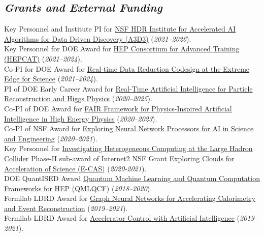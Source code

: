 \documentclass[11pt]{res}
\newcommand{\MarginText}[1]{\section{\textit{#1}}}
\begin{document}
\begin{resume}
  \MarginText{Grants and External Funding}
  Key Personnel and Institute PI for \href{https://www.nsf.gov/awardsearch/showAward?AWD_ID=2117997&HistoricalAwards=false}{NSF HDR Institute for Accelerated AI Algorithms for Data Driven Discovery (A3D3)} (\textit{2021--2026}).\\
  Key Personnel for DOE Award for \href{https://science.osti.gov/-/media/hep/pdf/Awards/HEP_instrumentation_awards_list.pdf}{HEP Consortium for Advanced Training (HEPCAT)} (\textit{2021--2024}).\\
  Co-PI for DOE Award for \href{https://science.osti.gov/-/media/ascr/pdf/funding/2021/Data_Reduction_Awards.pdf}{Real‐time Data Reduction Codesign at the Extreme Edge for Science} (\textit{2021--2024}).\\
  PI of DOE Early Career Award for \href{https://science.osti.gov/-/media/early-career/pdf/FY20_DOE_SC_Early_Career_Research_Program_Abstracts.pdf}{Real-Time Artificial Intelligence for Particle Reconstruction and Higgs Physics} (\textit{2020--2025}).\\
  Co-PI of DOE Award for \href{https://science.osti.gov/-/media/ascr/pdf/programdocuments/docs/2020/List_of_Awards_FAIR_Data.pdf}{FAIR Framework for Physics-Inspired Artificial Intelligence in High Energy Physics} (\textit{2020--2023}).\\
  Co-PI of NSF Award for \href{https://nsf.gov/awardsearch/showAward?AWD_ID=2005369}{Exploring Neural Network Processors for AI in Science and Engineering} (\textit{2020--2021}).\\
  Key Personnel for \href{https://www.internet2.edu/news/detail/17957/}{Investigating Heterogeneous Computing at the Large Hadron Collider} Phase-II sub-award of Internet2 NSF Grant \href{https://www.nsf.gov/awardsearch/showAward?AWD_ID=1904444}{Exploring Clouds for Acceleration of Science (E-CAS)} (\textit{2020-2021}).\\
  DOE QuantISED Award \href{https://pamspublic.science.energy.gov/WebPAMSExternal/Interface/Common/ViewPublicAbstract.aspx?rv=1f7d4729-6f93-40bd-a55f-c108545b1ea9&rtc=24&PRoleId=10}{Quantum Machine Learning and Quantum Computation Frameworks for HEP (QMLQCF)} (\textit{2018--2020}).\\
  Fermilab LDRD Award for \href{https://ldrd.fnal.gov/subdir/FNAL-LDRD-2019-017-D1.pdf}{Graph Neural Networks for Accelerating Calorimetry and Event Reconstruction} (\textit{2019--2021}).\\
  Fermilab LDRD Award for \href{https://ldrd.fnal.gov/subdir/FNAL-LDRD-2019-027-D1.pdf}{Accelerator Control with Artificial Intelligence} (\textit{2019--2021}).


\end{resume}
\end{document}
